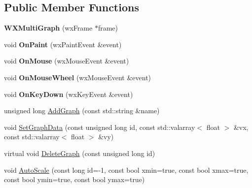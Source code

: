 \subsection*{Public Member Functions}
\begin{DoxyCompactItemize}
\item 
\mbox{\label{class_obj_cryst_1_1_w_x_multi_graph_a4fa23a89fd2197ad5514c593d4606b35}} 
{\bfseries W\+X\+Multi\+Graph} (wx\+Frame $\ast$frame)
\item 
\mbox{\label{class_obj_cryst_1_1_w_x_multi_graph_af283bdcacd2b0d7891a28086f928cb3c}} 
void {\bfseries On\+Paint} (wx\+Paint\+Event \&event)
\item 
\mbox{\label{class_obj_cryst_1_1_w_x_multi_graph_a3e04ef24541a1e67138f3c12c566a15b}} 
void {\bfseries On\+Mouse} (wx\+Mouse\+Event \&event)
\item 
\mbox{\label{class_obj_cryst_1_1_w_x_multi_graph_a54611df56da565760674542ddf1e67b8}} 
void {\bfseries On\+Mouse\+Wheel} (wx\+Mouse\+Event \&event)
\item 
\mbox{\label{class_obj_cryst_1_1_w_x_multi_graph_a6b5baddf04937dd88cf455cd80db892d}} 
void {\bfseries On\+Key\+Down} (wx\+Key\+Event \&event)
\item 
unsigned long \mbox{\hyperlink{class_obj_cryst_1_1_w_x_multi_graph_adf6e7de19af871df66a70214dad61905}{Add\+Graph}} (const std\+::string \&name)
\item 
void \mbox{\hyperlink{class_obj_cryst_1_1_w_x_multi_graph_a09c95e65cdf98714bb4dedcbe4fec310}{Set\+Graph\+Data}} (const unsigned long id, const std\+::valarray$<$ float $>$ \&vx, const std\+::valarray$<$ float $>$ \&vy)
\item 
virtual void \mbox{\hyperlink{class_obj_cryst_1_1_w_x_multi_graph_aeeea3497b22a397a5a521322698c3166}{Delete\+Graph}} (const unsigned long id)
\item 
void \mbox{\hyperlink{class_obj_cryst_1_1_w_x_multi_graph_ae74176e7ad5b5c348328147456569092}{Auto\+Scale}} (const long id=-\/1, const bool xmin=true, const bool xmax=true, const bool ymin=true, const bool ymax=true)
\item 
\mbox{\label{class_obj_cryst_1_1_w_x_multi_graph_acbc65949dfb9b202b19dc80ccf569b77}} 

\end{DoxyCompactItemize}
